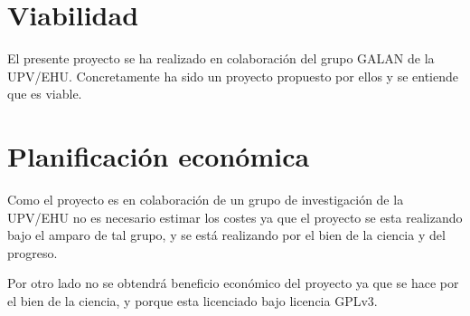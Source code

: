 \section{Viabilidad}
El presente proyecto se ha realizado en colaboraci\'{o}n del grupo GALAN de la UPV/EHU. Concretamente ha sido un proyecto propuesto por ellos
y se entiende que es viable.

\section{Planificaci\'{o}n econ\'{o}mica}
Como el proyecto es en colaboraci\'{o}n de un grupo de investigaci\'{o}n de la UPV/EHU no es necesario estimar los costes ya que
el proyecto se esta realizando bajo el amparo de tal grupo, y se est\'{a} realizando por el bien de la ciencia y del progreso.

Por otro lado no se obtendr\'{a} beneficio econ\'{o}mico del proyecto ya que se hace por el bien de la ciencia, y porque esta licenciado
bajo licencia GPLv3.





